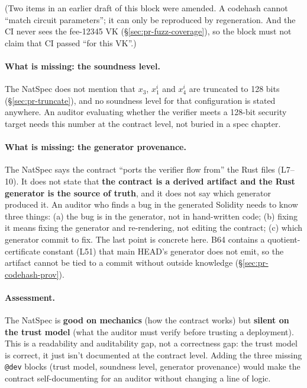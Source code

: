 \noindent(Two items in an earlier draft of this block were amended.
A codehash cannot ``match circuit parameters''; it can only be
reproduced by regeneration. And the CI never sees the fee-12345 VK
(\S\ref{sec:pr-fuzz-coverage}), so the block must not claim that
CI passed ``for this VK''.)

\paragraph{What is missing: the soundness level.} 
The NatSpec does not mention that $x_3$, $x_1^i$ and $x_4^i$ are
truncated to 128 bits (\S\ref{sec:pr-truncate}), and no soundness level
for that configuration is stated anywhere. An auditor evaluating whether the verifier meets a 128-bit
security target needs this number at the contract level, not
buried in a spec chapter.

\paragraph{What is missing: the generator provenance.} 
The NatSpec says the contract ``ports the verifier flow from'' the
Rust files (L7--10). It does not state that \textbf{the contract is
a derived artifact and the Rust generator is the source of truth},
and it does not say which generator produced it. An auditor who
finds a bug in the generated Solidity needs to know three things:
(a) the bug is in the generator, not in hand-written code;
(b) fixing it means fixing the generator and re-rendering, not
editing the contract; (c) which generator commit to fix. The last
point is concrete here. B64 contains a quotient-certificate
constant (L51) that main HEAD's generator does not emit, so the
artifact cannot be tied to a commit without outside knowledge
(\S\ref{sec:pr-codehash-prov}).

\paragraph{Assessment.} The NatSpec is \textbf{good on mechanics}
(how the contract works) but \textbf{silent on the trust model}
(what the auditor must verify before trusting a deployment). This
is a readability and auditability gap, not a correctness gap: the
trust model is correct, it just isn't documented at the contract
level. Adding the three missing \texttt{@dev} blocks (trust model,
soundness level, generator provenance) would make the contract
self-documenting for an auditor without changing a line of logic.

